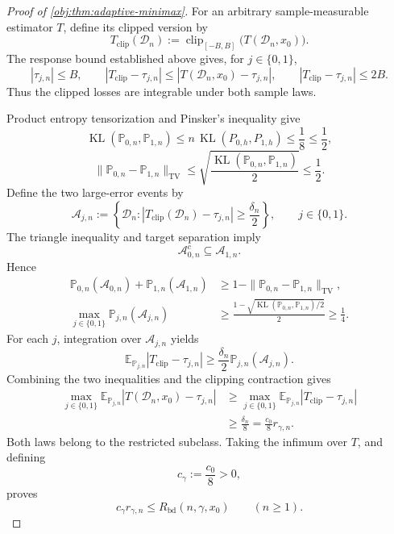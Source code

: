 \documentclass[11pt]{article}
\begin{document}
\begin{proof}[Proof of \cref{obj:thm:adaptive-minimax}]
For an arbitrary sample-measurable estimator \(T\), define its clipped version by
\[
T_{\mathrm{clip}}(\mathcal D_n)
:=
\operatorname{clip}_{[-B,B]}
\bigl(T(\mathcal D_n,x_0)\bigr).
\]
The response bound established above gives, for \(j\in\{0,1\}\),
\[
|\tau_{j,n}|\le B,
\qquad
|T_{\mathrm{clip}}-\tau_{j,n}|
\le |T(\mathcal D_n,x_0)-\tau_{j,n}|,
\qquad
|T_{\mathrm{clip}}-\tau_{j,n}|\le2B.
\]
Thus the clipped losses are integrable under both sample laws.

Product entropy tensorization and Pinsker's inequality give
\[
\operatorname{KL}(\mathbb P_{0,n},\mathbb P_{1,n})
\le n\,\operatorname{KL}(P_{0,h},P_{1,h})
\le\frac18\le\frac12,
\]
\[
\|\mathbb P_{0,n}-\mathbb P_{1,n}\|_{\mathrm{TV}}
\le
\sqrt{\frac{\operatorname{KL}(\mathbb P_{0,n},\mathbb P_{1,n})}{2}}
\le\frac12.
\]
Define the two large-error events by
\[
\mathcal A_{j,n}
:=
\left\{
\mathcal D_n:
|T_{\mathrm{clip}}(\mathcal D_n)-\tau_{j,n}|
\ge\frac{\delta_n}{2}
\right\},
\qquad j\in\{0,1\}.
\]
The triangle inequality and target separation imply
\[
\mathcal A_{0,n}^c\subseteq\mathcal A_{1,n}.
\]
Hence
\[
\begin{aligned}
\mathbb P_{0,n}(\mathcal A_{0,n})
+\mathbb P_{1,n}(\mathcal A_{1,n})
&\ge
1-\|\mathbb P_{0,n}-\mathbb P_{1,n}\|_{\mathrm{TV}},
\\
\max_{j\in\{0,1\}}\mathbb P_{j,n}(\mathcal A_{j,n})
&\ge
\frac{1-
\sqrt{\operatorname{KL}(\mathbb P_{0,n},\mathbb P_{1,n})/2}}{2}
\ge\frac14.
\end{aligned}
\]
For each \(j\), integration over \(\mathcal A_{j,n}\) yields
\[
\mathbb E_{\mathbb P_{j,n}}
|T_{\mathrm{clip}}-\tau_{j,n}|
\ge\frac{\delta_n}{2}\mathbb P_{j,n}(\mathcal A_{j,n}).
\]
Combining the two inequalities and the clipping contraction gives
\[
\begin{aligned}
\max_{j\in\{0,1\}}
\mathbb E_{\mathbb P_{j,n}}
|T(\mathcal D_n,x_0)-\tau_{j,n}|
&\ge
\max_{j\in\{0,1\}}
\mathbb E_{\mathbb P_{j,n}}
|T_{\mathrm{clip}}-\tau_{j,n}|
\\
&\ge\frac{\delta_n}{8}
=\frac{c_0}{8}r_{\gamma,n}.
\end{aligned}
\]
Both laws belong to the restricted subclass. Taking the infimum over \(T\), and defining
\[
c_\gamma:=\frac{c_0}{8}>0,
\]
proves
\[
c_\gamma r_{\gamma,n}
\le R_{\mathrm{bd}}(n,\gamma,x_0)
\qquad(n\ge1).
\]


\end{proof}
\end{document}
